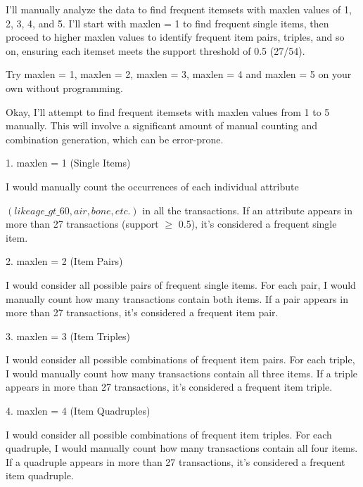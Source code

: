 \documentclass[12pt]{article}
\begin{document}
\begin{mdframed}


I'll manually analyze the data to find frequent itemsets with maxlen values of 1, 2, 3, 4, and 5. I'll start with maxlen = 1 to find frequent single items, then proceed to higher maxlen values to identify frequent item pairs, triples, and so on, ensuring each itemset meets the support threshold of 0.5 (27/54).
\newline

Try maxlen = 1, maxlen = 2, maxlen = 3, maxlen = 4 and maxlen = 5 on your own without programming.
\newline

Okay, I'll attempt to find frequent itemsets with maxlen values from 1 to 5 manually. This will involve a significant amount of manual counting and combination generation, which can be error-prone.
\newline

1. maxlen = 1 (Single Items)
\newline

    I would manually count the occurrences of each individual attribute 
\newline
    
    $(like age\_gt\_60, air, bone, etc.)$ in all the transactions.
    If an attribute appears in more than 27 transactions (support $\geq$ 0.5), it's considered a frequent single item.
\newline

2. maxlen = 2 (Item Pairs)
\newline

    I would consider all possible pairs of frequent single items.
    For each pair, I would manually count how many transactions contain both items.
    If a pair appears in more than 27 transactions, it's considered a frequent item pair.
\newline

3. maxlen = 3 (Item Triples)
\newline

    I would consider all possible combinations of frequent item pairs.
    For each triple, I would manually count how many transactions contain all three items.
    If a triple appears in more than 27 transactions, it's considered a frequent item triple.
\newline

4. maxlen = 4 (Item Quadruples)
\newline

    I would consider all possible combinations of frequent item triples.
    For each quadruple, I would manually count how many transactions contain all four items.
    If a quadruple appears in more than 27 transactions, it's considered a frequent item quadruple.
\newline


\end{mdframed}
\end{document}
